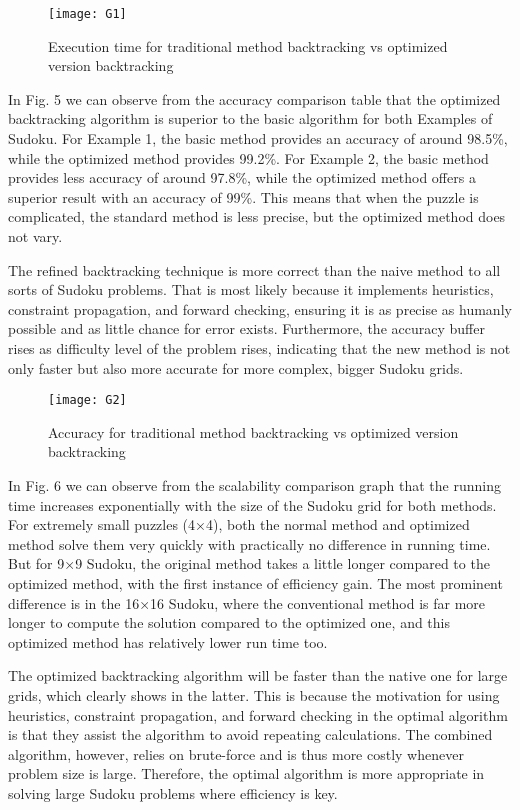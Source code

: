 \documentclass[conference]{IEEEtran}
\begin{document}
\begin{figure}[H]
    \centering
    \texttt{[image: G1]} 
    \caption{Execution time for traditional method backtracking vs optimized version backtracking}
    \label{fig:g1}
\end{figure}

In Fig. 5 we can observe from the accuracy comparison table that the optimized backtracking algorithm is superior to the basic algorithm for both Examples of Sudoku. For Example 1, the basic method provides an accuracy of around 98.5\%, while the optimized method provides 99.2\%. For Example 2, the basic method provides less accuracy of around 97.8\%, while the optimized method offers a superior result with an accuracy of 99\%. This means that when the puzzle is complicated, the standard method is less precise, but the optimized method does not vary.

The refined backtracking technique is more correct than the naive method to all sorts of Sudoku problems. That is most likely because it implements heuristics, constraint propagation, and forward checking, ensuring it is as precise as humanly possible and as little chance for error exists. Furthermore, the accuracy buffer rises as difficulty level of the problem rises, indicating that the new method is not only faster but also more accurate for more complex, bigger Sudoku grids.

\begin{figure}[H]
    \centering
    \texttt{[image: G2]} 
    \caption{Accuracy for traditional method backtracking vs optimized version backtracking}
    \label{fig:g2}
\end{figure}

In Fig. 6 we can observe from the scalability comparison graph that the running time increases exponentially with the size of the Sudoku grid for both methods. For extremely small puzzles (4×4), both the normal method and optimized method solve them very quickly with practically no difference in running time. But for 9×9 Sudoku, the original method takes a little longer compared to the optimized method, with the first instance of efficiency gain. The most prominent difference is in the 16×16 Sudoku, where the conventional method is far more longer to compute the solution compared to the optimized one, and this optimized method has relatively lower run time too.

The optimized backtracking algorithm will be faster than the native one for large grids, which clearly shows in the latter.
This is because the motivation for using heuristics, constraint propagation, and forward checking in the optimal algorithm is that they assist the algorithm to avoid repeating calculations. The combined algorithm, however, relies on brute-force and is thus more costly whenever problem size is large. Therefore, the optimal algorithm is more appropriate in solving large Sudoku problems where efficiency is key.
\end{document}
